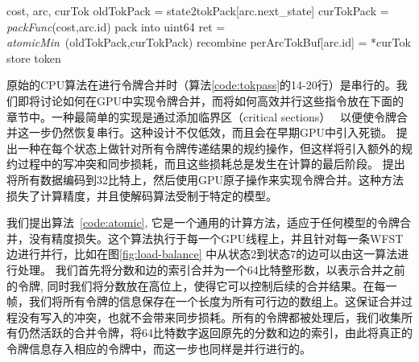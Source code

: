 \begin{algorithm}[ht]
\caption{线程级别的令牌合并算法 \textcolor[rgb]{0,0.5,0}{(Inputs: accumulated cost, an out-going WFST arc and a current token)}}
\label{code:atomic}
\begin{algorithmic}[1]
 {cost, arc, curTok}
\State oldTokPack = state2tokPack[arc.next\_state]
\State curTokPack = \textit{packFunc}(cost,arc.id) \Comment \textcolor[rgb]{0,0.5,0}{pack into uint64}
\State ret = \textit{atomicMin}~\footnotemark(oldTokPack,curTokPack)
         \Comment \textcolor[rgb]{0,0.5,0}{recombine}
\State  perArcTokBuf[arc.id] = *curTok \Comment \textcolor[rgb]{0,0.5,0}{store token}
\EndIf
\EndProcedure
\end{algorithmic}
\end{algorithm}


原始的CPU算法在进行令牌合并时（算法\ref{code:tokpass}的14-20行）是串行的。我们即将讨论如何在GPU中实现令牌合并，而将如何高效并行这些指令放在下面的章节中。一种最简单的实现是通过添加临界区（critical sections）~\cite{lamport1979make}
以便使令牌合并这一步仍然恢复串行。这种设计不仅低效，而且会在早期GPU中引入死锁。
\cite{you2009parallel} 提出一种在每个状态上做针对所有令牌传递结果的规约操作，但这样将引入额外的规约过程中的写冲突和同步损耗，而且这些损耗总是发生在计算的最后阶段。
%
\cite{kim2011h} 提出将所有数据编码到32比特上，然后使用GPU原子操作来实现令牌合并。这种方法损失了计算精度，并且使解码算法受制于特定的模型。

我们提出算法~\ref{code:atomic}, 它是一个通用的计算方法，适应于任何模型的令牌合并，没有精度损失。这个算法执行于每一个GPU线程上，并且针对每一条WFST边进行并行，比如在图\ref{fig:load-balance} 中从状态2到状态7的边可以由这一算法进行处理。
我们首先将分数和边的索引合并为一个64比特整形数，以表示合并之前的令牌, 同时我们将分数放在高位上，使得它可以控制后续的合并结果。在每一帧，我们将所有令牌的信息保存在一个长度为所有可行边的数组上。这保证合并过程没有写入的冲突，也就不会带来同步损耗。所有的令牌都被处理后，我们收集所有仍然活跃的合并令牌，将64比特数字返回原先的分数和边的索引，由此将真正的令牌信息存入相应的令牌中，而这一步也同样是并行进行的。


